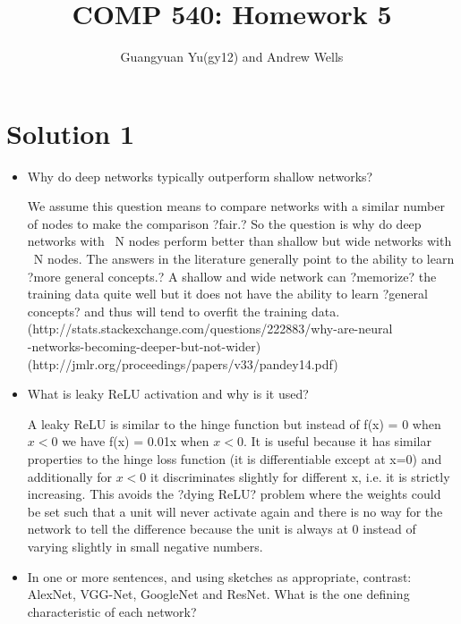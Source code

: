 \documentclass[12pt]{article}
\title{COMP 540: Homework 5}
\author{Guangyuan Yu(gy12) and Andrew Wells}
\begin{document}
\maketitle


\section*{Solution 1}
\begin{itemize}
\item Why do deep networks typically outperform shallow networks?

We assume this question means to compare networks with a similar number of nodes to make the comparison ?fair.? So the question is why do deep networks with ~N nodes perform better than shallow but wide networks with ~N nodes. The answers in the literature generally point to the ability to learn ?more general concepts.? A shallow and wide network can ?memorize? the training data quite well but it does not have the ability to learn ?general concepts? and thus will tend to overfit the training data.\\ (http://stats.stackexchange.com/questions/222883/why-are-neural\\-networks-becoming-deeper-but-not-wider)\\ (http://jmlr.org/proceedings/papers/v33/pandey14.pdf)

\item What is leaky ReLU activation and why is it used?

A leaky ReLU is similar to the hinge function but instead of f(x) = 0 when $x < 0$ we have f(x) = 0.01x when $x < 0$. It is useful because it has similar properties to the hinge loss function (it is differentiable except at x=0) and additionally for $x < 0$ it discriminates slightly for different x, i.e. it is strictly increasing. This avoids the ?dying ReLU? problem where the weights could be set such that a unit will never activate again and there is no way for the network to tell the difference because the unit is always at 0 instead of varying slightly in small negative numbers. 

\item In one or more sentences, and using sketches as appropriate, contrast: AlexNet, VGG-Net, GoogleNet and ResNet. What is the one defining characteristic of each network?


\end{itemize}
\end{document}
